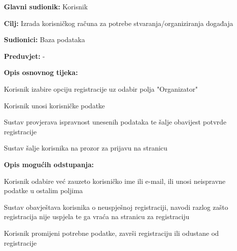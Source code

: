 					\noindent {}
					\begin{packed_item}
					\item \textbf{Glavni sudionik:} Korisnik
					\item  \textbf{Cilj:} Izrada korisničkog računa za potrebe stvaranja/organiziranja događaja
					\item  \textbf{Sudionici:} Baza podataka
					\item  \textbf{Preduvjet:} -
					\item  \textbf{Opis osnovnog tijeka:}
					
					\item[] \begin{packed_enum}
						
						\item Korisnik izabire opciju registracije uz odabir polja "Organizator"
						\item Korisnik unosi korisničke podatke
						\item Sustav provjerava ispravnost unesenih podataka te šalje obavijest potvrde registracije
						\item Sustav šalje korisnika na prozor za prijavu na stranicu
					\end{packed_enum}
					
											\item  \textbf{Opis mogućih odstupanja:}
					
					\item[] \begin{packed_item}
						
						\item[2.a] Korisnik odabire već zauzeto korisničko ime ili e-mail, ili unosi neispravne podatke u ostalim poljima 
						\item[] \begin{packed_enum}
							
							\item Sustav obavještava korisnika o neuspješnoj registraciji, navodi razlog zašto
							registracija nije uspjela te ga vraća na stranicu za registraciju
							\item Korisnik promijeni potrebne podatke, završi registraciju ili odustane od registracije
							
						\end{packed_enum}
					\end{packed_item}
					
				\end{packed_item}
			
